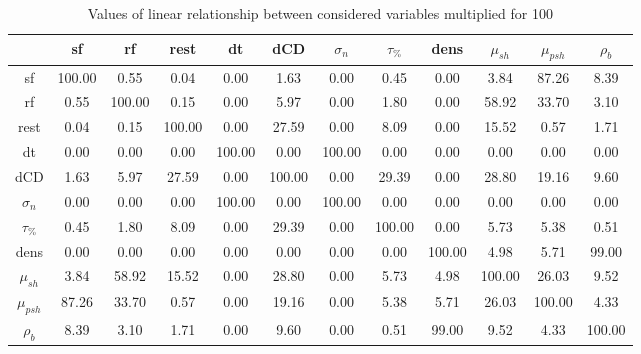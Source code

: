\begin{table}[h]
\centering
\begin{tabular}{cccccccccccc}
          & sf    & rf    & rest  & dt    & dCD & $\sigma_n$ & $\tau_\%$ &
          dens & $\mu_{sh}$  & $\mu_{psh}$ & $\rho_b$ \\
\hline
sf    & 100.00 & 0.55  & 0.04  & 0.00  & 1.63  & 0.00  & 0.45  & 0.00  & 3.84  & 87.26 & 8.39 \\
    rf    & 0.55  & 100.00 & 0.15  & 0.00  & 5.97  & 0.00  & 1.80  & 0.00  & 58.92 & 33.70 & 3.10 \\
    rest  & 0.04  & 0.15  & 100.00 & 0.00  & 27.59 & 0.00  & 8.09  & 0.00  & 15.52 & 0.57  & 1.71 \\
    dt    & 0.00  & 0.00  & 0.00  & 100.00 & 0.00  & 100.00 & 0.00  & 0.00  & 0.00  & 0.00  & 0.00 \\
    dCD & 1.63  & 5.97  & 27.59 & 0.00  & 100.00 & 0.00  & 29.39 & 0.00  & 28.80 & 19.16 & 9.60 \\
    $\sigma_n$ & 0.00  & 0.00  & 0.00  & 100.00 & 0.00  & 100.00 & 0.00  & 0.00  & 0.00  & 0.00  & 0.00 \\
    $\tau_\%$ & 0.45  & 1.80  & 8.09  & 0.00  & 29.39 & 0.00  & 100.00 & 0.00  & 5.73  & 5.38  & 0.51 \\
    dens  & 0.00  & 0.00  & 0.00  & 0.00  & 0.00  & 0.00  & 0.00  & 100.00 & 4.98  & 5.71  & 99.00 \\
    $\mu_{sh}$  & 3.84  & 58.92 & 15.52 & 0.00  & 28.80 & 0.00  & 5.73  & 4.98  & 100.00 & 26.03 & 9.52 \\
    $\mu_{psh}$ & 87.26 & 33.70 & 0.57  & 0.00  & 19.16 & 0.00  & 5.38  & 5.71 
    & 26.03 & 100.00 & 4.33 \\
    $\rho_b$  & 8.39  & 3.10  & 1.71  & 0.00  & 9.60  & 0.00  & 0.51  & 99.00 & 9.52  & 4.33  & 100.00 \\
\hline
\end{tabular}
\caption{Values of linear relationship between considered variables multiplied
for 100}
\label{tab:06inputRelationshipTable}
\end{table}